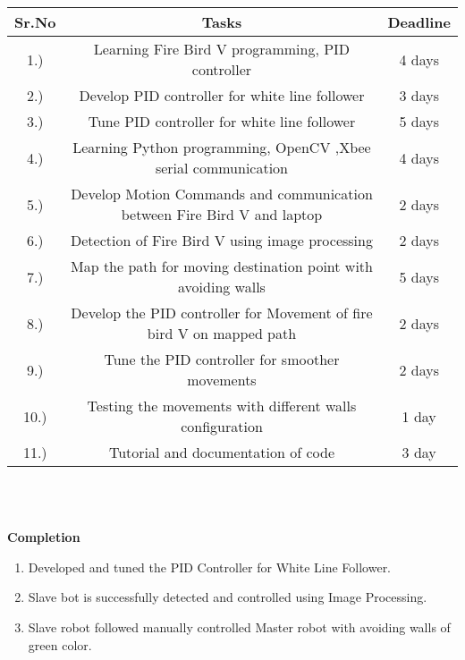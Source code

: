 \documentclass[report]{res}
\begin{document}
	
	\begin{tabular}{ | c | c | c |}
		\hline
		\bf Sr.No & \bf Tasks & \bf Deadline \\ 
		\hline
		1.) & Learning Fire Bird V programming, PID controller & 4 days \\
		\hline
		2.) & Develop PID controller for white line follower & 3 days \\
		\hline
		3.) & Tune PID controller for white line follower & 5 days \\
		\hline
		4.) & Learning Python programming, OpenCV ,Xbee serial communication& 4 days \\
		\hline
		5.) & Develop Motion Commands and communication between Fire Bird V and laptop & 2 days \\ 
		\hline
		6.) & Detection of Fire Bird V using image processing & 2 days \\ 
		\hline
		7.) & Map the path for moving destination point with avoiding walls & 5 days \\ 
		\hline
		8.) & Develop the PID controller for Movement of fire bird V on mapped path & 2 days\\ 
		\hline
		9.) & Tune the PID controller for smoother movements & 2 days \\ 
		\hline
		10.) & Testing the movements with different walls configuration & 1 day \\ 
		\hline
		11.) & Tutorial and documentation of code & 3 day \\ 
		\hline
		
	\end{tabular} \\ \\
	
	\pagebreak	
	
	
	\begin{center}
		{\huge \textbf{Completion}\par}
	\end{center}
	
	\begin{enumerate}
		\item Developed and tuned the PID Controller for White Line Follower. \\
		\item Slave bot is successfully detected and controlled using Image Processing. \\
		\item Slave robot followed manually controlled Master robot with avoiding walls of green color. \\
	\end{enumerate}
	
\end{document}
